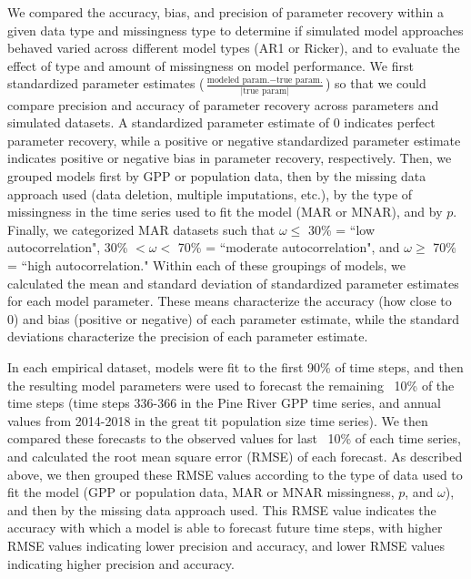 \documentclass{article}
\begin{document}
We compared the accuracy, bias, and precision of parameter recovery within a given data type and missingness type to determine if simulated model approaches behaved varied across different model types (AR1 or Ricker), and to evaluate the effect of type and amount of missingness on model performance. We first standardized parameter estimates ($\frac{\text{modeled param.} - \text{true param.}}{|\text{true param}|}$) so that we could compare precision and accuracy of parameter recovery across parameters and simulated datasets. A standardized parameter estimate of 0 indicates perfect parameter recovery, while a positive or negative standardized parameter estimate indicates positive or negative bias in parameter recovery, respectively. Then, we grouped models first by GPP or population data, then by the missing data approach used (data deletion, multiple imputations, etc.), by the type of missingness in the time series used to fit the model (MAR or MNAR), and by $p$. Finally, we categorized MAR datasets such that $\omega\leq$ 30\% = ``low autocorrelation", 30\% $<\omega<$ 70\% = ``moderate autocorrelation", and $\omega\geq$ 70\% = ``high autocorrelation." Within each of these groupings of models, we calculated the mean and standard deviation of standardized parameter estimates for each model parameter. These means characterize the accuracy (how close to 0) and bias (positive or negative) of each parameter estimate, while the standard deviations characterize the precision of each parameter estimate.  

In each empirical dataset, models were fit to the first 90\% of time steps, and then the resulting model parameters were used to forecast the remaining ~10\% of the time steps (time steps 336-366 in the Pine River GPP time series, and annual values from 2014-2018 in the great tit population size time series). We then compared these forecasts to the observed values for last ~10\% of each time series, and calculated the root mean square error (RMSE) of each forecast. As described above, we then grouped these RMSE values according to the type of data used to fit the model (GPP or population data, MAR or MNAR missingness, $p$, and $\omega$), and then by the missing data approach used. This RMSE value indicates the accuracy with which a model is able to forecast future time steps, with higher RMSE values indicating lower precision and accuracy, and lower RMSE values indicating higher precision and accuracy.     
\end{document}
